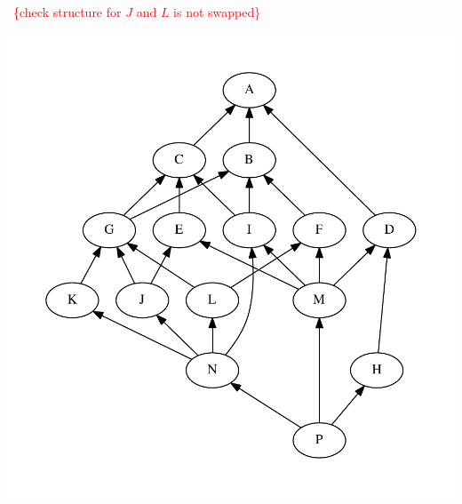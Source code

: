 \documentclass[11pt,oneside]{article}
\newcommand{\todo}[1]{\ \textcolor{red}{\{#1\}}\ }
\begin{document}
\todo{check structure for $J$ and $L$ is not swapped}

\begin{center}
\includegraphics[width=0.6\columnwidth]{subgroups_gl32.pdf} 
\end{center}
\end{document}
